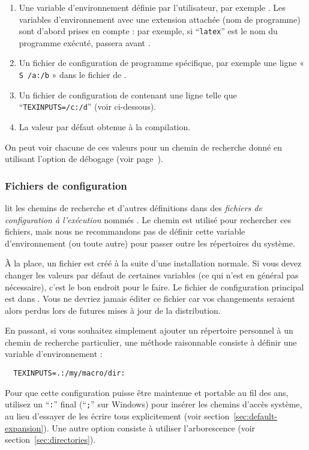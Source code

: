 \documentclass[german, english, french]{article}
\renewcommand{\samp}[1]{\enquote{\texttt{#1}}}
\begin{document}
\begin{enumerate}
\item Une variable d'environnement définie par l'utilisateur, par exemple
  . Les variables d'environnement avec une extension attachée
  (nom de programme) sont d'abord prises en compte : par exemple, si
  \samp{latex} est le nom du programme exécuté, 
  passera avant .
\item Un fichier de configuration de programme spécifique, par exemple une ligne
  « \texttt{S /a:/b} » dans le fichier  de .
\item Un fichier de configuration  de \KPS{} contenant une ligne
  telle que \\ \samp{TEXINPUTS=/c:/d} (voir ci-dessous).
\item La valeur par défaut obtenue à la compilation.
\end{enumerate}
\noindent On peut voir chacune de ces valeurs pour un chemin de recherche donné
en utilisant l'option de débogage (voir page~\pageref{sec:debugging}).

\subsubsection{Fichiers de configuration}

\KPS{} lit les chemins de recherche et d'autres définitions dans des
\emph{fichiers de configuration à l'exécution} nommés . Le
chemin  est utilisé pour rechercher ces fichiers, mais nous ne
recommandons pas de définir cette variable d'environnement (ou toute autre) pour
passer outre les répertoires du système.

À la place, un fichier  est créé à la suite d'une
installation normale. Si vous devez changer les valeurs par défaut de certaines
variables (ce qui n'est en général pas nécessaire), c'est le bon endroit pour le
faire. Le fichier de configuration principal est dans
. Vous ne devriez jamais éditer ce
fichier car vos changements seraient alors perdus lors de futures mises à jour
de la distribution.

En passant, si vous souhaitez simplement ajouter un répertoire personnel à un
chemin de recherche particulier, une méthode raisonnable consiste à définir une
variable d'environnement :
\begin{verbatim}
  TEXINPUTS=.:/my/macro/dir:
\end{verbatim}
Pour que cette configuration puisse être maintenue et portable au fil des ans,
utilisez un \samp{:} final (\samp{;} sur Windows) pour insérer les chemins
d'accès système, au lieu d'essayer de les écrire tous explicitement (voir
section~\ref{sec:default-expansion}). Une autre option consiste à utiliser
l'arborescence  (voir section~\ref{sec:directories}).
\end{document}
